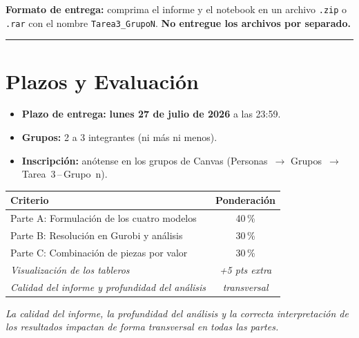 \documentclass[12pt,a4paper]{article}
\begin{document}
\medskip
\noindent\textbf{Formato de entrega:} comprima el informe y el notebook en un
archivo \texttt{.zip} o \texttt{.rar} con el nombre \texttt{Tarea3\_GrupoN}.
\textbf{No entregue los archivos por separado.}

\noindent\rule{\linewidth}{0.4pt}

\section*{Plazos y Evaluación}

\begin{itemize}[topsep=2pt]
    \item \textbf{Plazo de entrega:} \textbf{lunes 27 de julio de 2026} a las
          23:59.
    \item \textbf{Grupos:} 2 a 3 integrantes (ni más ni menos).
    \item \textbf{Inscripción:} anótense en los grupos de Canvas
          (Personas~$\to$ Grupos~$\to$ Tarea~3\,--\,Grupo~n).
\end{itemize}

\vspace{0.5em}

\begin{center}
\renewcommand{\arraystretch}{1.2}
\begin{tabular}{lc}
\toprule
\textbf{Criterio} & \textbf{Ponderación} \\
\midrule
Parte A: Formulación de los cuatro modelos      & 40\,\% \\
Parte B: Resolución en Gurobi y análisis        & 30\,\% \\
Parte C: Combinación de piezas por valor        & 30\,\% \\
\midrule
\textit{Visualización de los tableros}          & \textit{+5 pts extra} \\
\textit{Calidad del informe y profundidad del análisis} &
\textit{transversal} \\
\bottomrule
\end{tabular}
\end{center}

\vspace{0.3em}
\noindent\textit{La calidad del informe, la profundidad del análisis y la correcta
interpretación de los resultados impactan de forma transversal en todas las
partes.}
\end{document}
